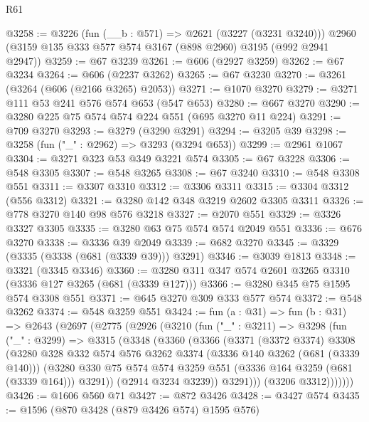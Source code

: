 \begin{lexlean}{R61}
\begin{coremodule}
@3258 := @3226
    (fun (__b : @571) => @2621 (@3227 (@3231 @3240)))
    @2960
    (@3159 @135 @333 @577 @574 @3167 (@898 @2960) @3195 (@992 @2941 @2947))
@3259 := @67 @3239
@3261 := @606 (@2927 @3259)
@3262 := @67 @3234
@3264 := @606 (@2237 @3262)
@3265 := @67 @3230
@3270 := @3261 (@3264 (@606 (@2166 @3265) @2053))
@3271 := @1070 @3270
@3279 := @3271 @111 @53 @241 @576 @574 @653 (@547 @653)
@3280 := @667 @3270
@3290 := @3280 @225 @75 @574 @574 @224 @551 (@695 @3270 @11 @224)
@3291 := @709 @3270
@3293 := @3279 (@3290 @3291)
@3294 := @3205 @39
@3298 := @3258 (fun ("_" : @2962) => @3293 (@3294 @653))
@3299 := @2961 @1067
@3304 := @3271 @323 @53 @349 @3221 @574
@3305 := @67 @3228
@3306 := @548 @3305
@3307 := @548 @3265
@3308 := @67 @3240
@3310 := @548 @3308 @551
@3311 := @3307 @3310
@3312 := @3306 @3311
@3315 := @3304 @3312 (@556 @3312)
@3321 := @3280 @142 @348 @3219 @2602 @3305 @3311
@3326 := @778 @3270 @140 @98 @576 @3218
@3327 := @2070 @551
@3329 := @3326 @3327 @3305
@3335 := @3280 @63 @75 @574 @574 @2049 @551
@3336 := @676 @3270
@3338 := @3336 @39 @2049
@3339 := @682 @3270
@3345 := @3329 (@3335 (@3338 (@681 (@3339 @39))) @3291)
@3346 := @3039 @1813
@3348 := @3321 (@3345 @3346)
@3360 := @3280 @311 @347 @574 @2601 @3265 @3310 (@3336 @127 @3265 (@681 (@3339 @127)))
@3366 := @3280 @345 @75 @1595 @574 @3308 @551
@3371 := @645 @3270 @309 @333 @577 @574
@3372 := @548 @3262
@3374 := @548 @3259 @551
@3424 := fun (a : @31) =>
  fun (b : @31) =>
  @2643
    (@2697
      (@2775
        (@2926
          (@3210
            (fun ("_" : @3211) =>
            @3298
              (fun ("_" : @3299) =>
              @3315
                (@3348
                  (@3360
                    (@3366
                      (@3371
                        (@3372 @3374)
                        @3308
                        (@3280
                          @328
                          @332
                          @574
                          @576
                          @3262
                          @3374
                          (@3336 @140 @3262 (@681 (@3339 @140)))
                          (@3280
                            @330
                            @75
                            @574
                            @574
                            @3259
                            @551
                            (@3336 @164 @3259 (@681 (@3339 @164)))
                            @3291))
                        (@2914 @3234 @3239))
                      @3291)))
                (@3206 @3312)))))))
@3426 := @1606 @560 @71
@3427 := @872 @3426
@3428 := @3427 @574
@3435 := @1596 (@870 @3428 (@879 @3426 @574) @1595 @576)

\end{coremodule}
\end{lexlean}
